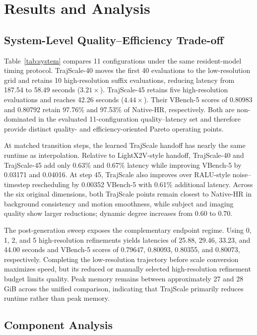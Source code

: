\section{Results and Analysis}

\subsection{System-Level Quality--Efficiency Trade-off}

Table~\ref{tab:system} compares 11 configurations under the same resident-model
timing protocol. TrajScale-40 moves the first 40 evaluations to the
low-resolution grid and retains 10 high-resolution suffix evaluations,
reducing latency from 187.54 to 58.49 seconds (\(3.21\times\)). TrajScale-45
retains five high-resolution evaluations and reaches 42.26 seconds
(\(4.44\times\)). Their VBench-5 scores of 0.80983 and 0.80792 retain
97.76\% and 97.53\% of Native-HR, respectively. Both are non-dominated in the
evaluated 11-configuration quality--latency set and therefore provide distinct
quality- and efficiency-oriented Pareto operating points.

At matched transition steps, the learned TrajScale handoff has nearly the same
runtime as interpolation. Relative to LightX2V-style handoff, TrajScale-40 and
TrajScale-45 add only 0.63\% and 0.67\% latency while improving VBench-5 by
0.03171 and 0.04016. At step 45, TrajScale also improves over RALU-style
noise--timestep rescheduling by 0.00352 VBench-5 with 0.61\% additional
latency. Across the six original dimensions, both TrajScale points remain
closest to Native-HR in background consistency and motion smoothness, while
subject and imaging quality show larger reductions; dynamic degree increases
from 0.60 to 0.70.

The post-generation sweep exposes the complementary endpoint regime. Using
0, 1, 2, and 5 high-resolution refinements yields latencies of 25.88, 29.46,
33.23, and 44.00 seconds and VBench-5 scores of 0.79647, 0.80093, 0.80355,
and 0.80073, respectively. Completing the low-resolution trajectory before
scale conversion maximizes speed, but its reduced or manually selected
high-resolution refinement budget limits quality. Peak memory remains between
approximately 27 and 28 GiB across the unified comparison, indicating that
TrajScale primarily reduces runtime rather than peak memory.

\subsection{Component Analysis}

